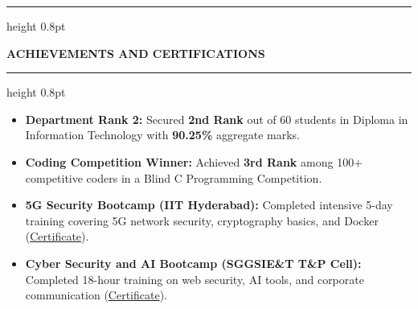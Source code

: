 \documentclass[letterpaper,10pt]{article}
\newcommand{\resumesection}[1]{%
  \vspace{4pt}%
  {\color{navy}\hrule height 0.8pt}%
  \vspace{2.5pt}%
  \begin{center}%
    {\color{navy}\bfseries\small\MakeUppercase{#1}}%
  \end{center}%
  \vspace{-7.5pt}%
  {\color{navy}\hrule height 0.8pt}%
  \vspace{3pt}%
}
\newcommand{\resumeItem}[1]{%
  \item \small{\color{charcoal}#1}%
}
\begin{document}
\resumesection{Achievements and Certifications}
\begin{itemize}[leftmargin=0.15in, itemsep=-2pt, topsep=1pt, parsep=0pt]
  \resumeItem{\textbf{Department Rank 2:} Secured \textbf{2nd Rank} out of 60 students in Diploma in Information Technology with \textbf{90.25\%} aggregate marks.}
  \resumeItem{\textbf{Coding Competition Winner:} Achieved \textbf{3rd Rank} among 100+ competitive coders in a Blind C Programming Competition.}
  \resumeItem{\textbf{5G Security Bootcamp (IIT Hyderabad):} Completed intensive 5-day training covering 5G network security, cryptography basics, and Docker (\href{https://drive.google.com/file/d/1YzZ2-vSy_SLP0esGtqzAZHZotbUyRQpL/view?usp=sharing}{Certificate}).}
  \resumeItem{\textbf{Cyber Security and AI Bootcamp (SGGSIE\&T T\&P Cell):} Completed 18-hour training on web security, AI tools, and corporate communication (\href{https://drive.google.com/file/d/1X0pr_JkimAg2ER5Hg-aGfPaGs8qrcvOk/view?usp=sharing}{Certificate}).}
\end{itemize}
\end{document}
